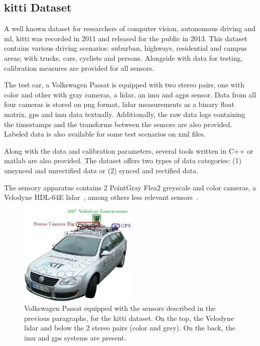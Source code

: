 \subsection{\acl{kitti} Dataset}
A well known dataset for researchers of computer vision, autonomous driving and \ac{ml}, \ac{kitti} was recorded in 2011 and released for the public in 2013. This dataset contains various driving scenarios: suburban, highways, residential and campus areas; with trucks, cars, cyclists and persons. Alongside with data for testing, calibration measures are provided for all sensors.

The test car, a Volkswagen Passat is equipped with two stereo pairs, one with color and other with gray cameras, a \ac{lidar}, an \ac{imu} and a\ac{gps} sensor. Data from all four cameras is stored on \ac{png} format, \ac{lidar} measurements as a binary float matrix, \ac{gps} and {imu} data textually. Additionally, the raw data logs containing the timestamps and the transforms between the sensors are also provided. Labeled data is also available for some test scenarios on \ac{xml} files.

Along with the data and calibration parameters, several tools written in C++ or \ac{matlab} are also provided. The dataset offers two types of data categories: (1) unsynced and unrectified data or (2) synced and rectified data. 

The sensory apparatus contains 2 PointGray Flea2 greyscale and color cameras, a Velodyne HDL-64E \ac{lidar}~\cite{VelodyneHDL64}, among others less relevant sensors~\cite{Geiger2013a}.

\begin{figure}
	\centering
	\includegraphics[width=0.5\textwidth]{img/sensor_fusion/passat_sensors.jpg}
	\caption{Volkswagen Passat equipped with the sensors described in the previous paragraphs, for the \ac{kitti} dataset. On the top, the Velodyne \ac{lidar} and below the 2 stereo pairs (color and grey). On the back, the \ac{imu} and {gps} systems are present.}
	\label{fig:sota:kitti_sensors}
\end{figure}


